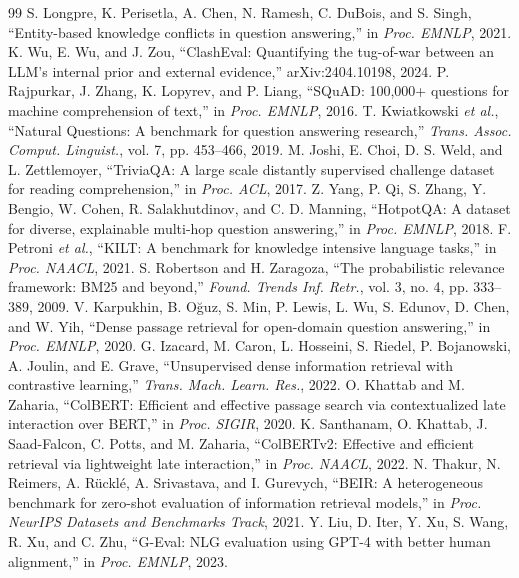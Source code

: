 \documentclass[conference]{IEEEtran}
\begin{document}
\begin{thebibliography}{99}
 S. Longpre, K. Perisetla, A. Chen, N. Ramesh, C. DuBois, and S. Singh, ``Entity-based knowledge conflicts in question answering,'' in \emph{Proc. EMNLP}, 2021.
 K. Wu, E. Wu, and J. Zou, ``ClashEval: Quantifying the tug-of-war between an LLM's internal prior and external evidence,'' arXiv:2404.10198, 2024.
 P. Rajpurkar, J. Zhang, K. Lopyrev, and P. Liang, ``SQuAD: 100,000+ questions for machine comprehension of text,'' in \emph{Proc. EMNLP}, 2016.
 T. Kwiatkowski \emph{et al.}, ``Natural Questions: A benchmark for question answering research,'' \emph{Trans. Assoc. Comput. Linguist.}, vol. 7, pp. 453--466, 2019.
 M. Joshi, E. Choi, D. S. Weld, and L. Zettlemoyer, ``TriviaQA: A large scale distantly supervised challenge dataset for reading comprehension,'' in \emph{Proc. ACL}, 2017.
 Z. Yang, P. Qi, S. Zhang, Y. Bengio, W. Cohen, R. Salakhutdinov, and C. D. Manning, ``HotpotQA: A dataset for diverse, explainable multi-hop question answering,'' in \emph{Proc. EMNLP}, 2018.
 F. Petroni \emph{et al.}, ``KILT: A benchmark for knowledge intensive language tasks,'' in \emph{Proc. NAACL}, 2021.
 S. Robertson and H. Zaragoza, ``The probabilistic relevance framework: BM25 and beyond,'' \emph{Found. Trends Inf. Retr.}, vol. 3, no. 4, pp. 333--389, 2009.
 V. Karpukhin, B. O\u{g}uz, S. Min, P. Lewis, L. Wu, S. Edunov, D. Chen, and W. Yih, ``Dense passage retrieval for open-domain question answering,'' in \emph{Proc. EMNLP}, 2020.
 G. Izacard, M. Caron, L. Hosseini, S. Riedel, P. Bojanowski, A. Joulin, and E. Grave, ``Unsupervised dense information retrieval with contrastive learning,'' \emph{Trans. Mach. Learn. Res.}, 2022.
 O. Khattab and M. Zaharia, ``ColBERT: Efficient and effective passage search via contextualized late interaction over BERT,'' in \emph{Proc. SIGIR}, 2020.
 K. Santhanam, O. Khattab, J. Saad-Falcon, C. Potts, and M. Zaharia, ``ColBERTv2: Effective and efficient retrieval via lightweight late interaction,'' in \emph{Proc. NAACL}, 2022.
 N. Thakur, N. Reimers, A. R\"uckl\'e, A. Srivastava, and I. Gurevych, ``BEIR: A heterogeneous benchmark for zero-shot evaluation of information retrieval models,'' in \emph{Proc. NeurIPS Datasets and Benchmarks Track}, 2021.
 Y. Liu, D. Iter, Y. Xu, S. Wang, R. Xu, and C. Zhu, ``G-Eval: NLG evaluation using GPT-4 with better human alignment,'' in \emph{Proc. EMNLP}, 2023.

\end{thebibliography}
\end{document}
